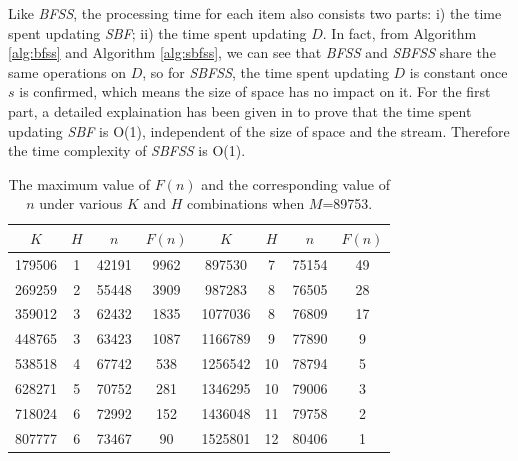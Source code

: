 \documentclass[conference]{IEEEtran}
\begin{document}
\begin{IEEEproof}
Like \emph{BFSS}, the processing time for each item also consists two parts: i) the time spent updating \emph{SBF}; ii) the time spent updating $D$. In fact, from Algorithm \ref{alg:bfss} and Algorithm \ref{alg:sbfss}, we can see that \emph{BFSS} and \emph{SBFSS} share the same operations on $D$, so for \emph{SBFSS}, the time spent updating $D$ is constant once $s$ is confirmed, which means the size of space has no impact on it. For the first part, a detailed explaination has been given in \cite{IEEEexample:sbf} to prove that the time spent updating \emph{SBF} is O(1), independent of the size of space and the stream. Therefore the time complexity of \emph{SBFSS} is O(1).
\end{IEEEproof}
\begin{table} 
	\centering
	\caption{The maximum value of $F(n)$ and the corresponding value of $n$ under various $K$ and $H$ combinations when $M$=89753.}
	\begin{tabular}{|c|c|c|c||c|c|c|c|}
		\hline
		$K$ & $H$& $n$ & $F(n)$ & $K$ & $H$ & $n$ &$F(n)$\\ 
		\hline
		179506&1&42191&9962&897530&7&75154&49\\
		\hline
		269259&2&55448&3909&987283&8&76505&28\\
		\hline
		359012&3&62432&1835&1077036&8&76809&17\\
		\hline
		448765&3&63423&1087&1166789&9&77890&9\\
		\hline
		538518&4&67742&538&1256542&10&78794&5\\
		\hline
		628271&5&70752&281&1346295&10&79006&3\\
		\hline
		718024&6&72992&152&1436048&11&79758&2\\
		\hline
		807777&6&73467&90&1525801&12&80406&1\\
		\hline
	\end{tabular}
	\label{tab:89753}
\end{table}
\end{document}

